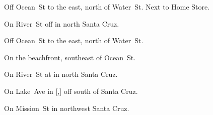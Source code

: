 
\begin{LocationList}

Off Ocean~St to the east, north of Water~St.
Next to Home Store.

On  River~St off  in north Santa Cruz.

Off Ocean~St to the east, north of Water~St.

On the beachfront, southeast of Ocean~St.

On  River~St at  in north Santa Cruz.

On  Lake~Ave in [,] off  south of Santa Cruz.

\Location{\TruckStop \Gas \Rest \Service}
On  Mission~St in northwest Santa Cruz.

\end{LocationList}
